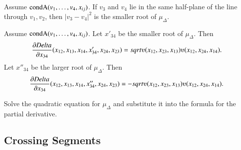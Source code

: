 \begin{tarskidata}
\begin{tarski}
\begin{lemma}
Assume ${\operatorname{condA}}(v_1,\ldots,v_4,x_{ij})$.
If $v_3$ and $v_4$ lie in the same half-plane of the line through $v_1,v_2$, then 
 $|v_3-v_4|^2$ is the smaller root of $\mu_\Delta$.
\end{lemma}

\begin{proved}
\swallowed\end{proved}
\end{tarski}




\begin{tarski}

\begin{lemma}
Assume ${\operatorname{condA}}(v_1,\ldots,v_4,x_{ij})$.
Let $x'_{34}$ be the smaller root
of $\mu_\Delta$.  Then
  $$\frac{\partial\Delta}{\partial x_{34}} (x_{12},x_{13},x_{14},
   x'_{34},x_{24},x_{23}) = 
    \sqrt{\ups(x_{12},x_{23},x_{13}) \ups(x_{12},x_{24},x_{14})}.
  $$
Let $x''_{34}$ be the larger root
of $\mu_\Delta$.  Then
  $$\frac{\partial\Delta}{\partial x_{34}} (x_{12},x_{13},x_{14},
   x''_{34},x_{24},x_{23}) = 
    -\sqrt{\ups(x_{12},x_{23},x_{13}) \ups(x_{12},x_{24},x_{14})}.
  $$
\end{lemma}

\begin{proved} Solve the quadratic equation for $\mu_\Delta$ and substitute
it into the formula for the partial derivative.
\swallowed\end{proved}
\end{tarski}









\begin{tarski}
\section{Crossing Segments}


\end{tarski}
\end{tarskidata}
